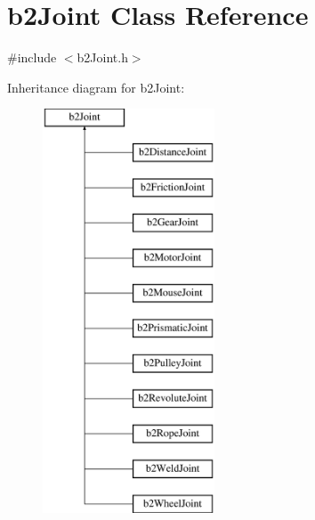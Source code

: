 \hypertarget{classb2_joint}{}\section{b2\+Joint Class Reference}
\label{classb2_joint}


{\ttfamily \#include $<$b2\+Joint.\+h$>$}

Inheritance diagram for b2\+Joint\+:\begin{figure}[H]
\begin{center}
\leavevmode
\includegraphics[height=12.000000cm]{classb2_joint}
\end{center}
\end{figure}
